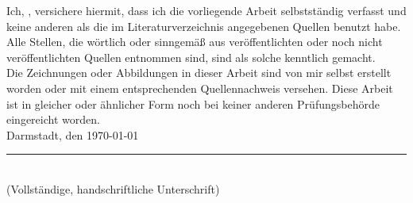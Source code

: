 \documentclass[
11pt, %
english,
singlespacing, %
]{MastersDoctoralThesis} %
\begin{document}
\begin{declaration}
\addchaptertocentry{\authorshipname} %
\noindent Ich, \authorname, versichere hiermit, dass ich die vorliegende Arbeit selbstständig verfasst und keine anderen als die im Literaturverzeichnis angegebenen Quellen benutzt habe. \\ 

\noindent Alle Stellen, die wörtlich oder sinngemäß aus veröffentlichten oder noch nicht veröffentlichten Quellen entnommen sind, sind als solche kenntlich gemacht.\\

\noindent Die Zeichnungen oder Abbildungen in dieser Arbeit sind von mir selbst erstellt worden oder mit einem entsprechenden Quellennachweis versehen. Diese Arbeit ist in gleicher oder ähnlicher Form noch bei keiner anderen Prüfungsbehörde eingereicht worden.\\

\noindent Darmstadt, den \today

\vspace{5em}
\noindent\rule[1em]{25em}{0.5pt}\\ %
(Vollständige, handschriftliche Unterschrift)

\end{declaration}

\cleardoublepage
\end{document}

